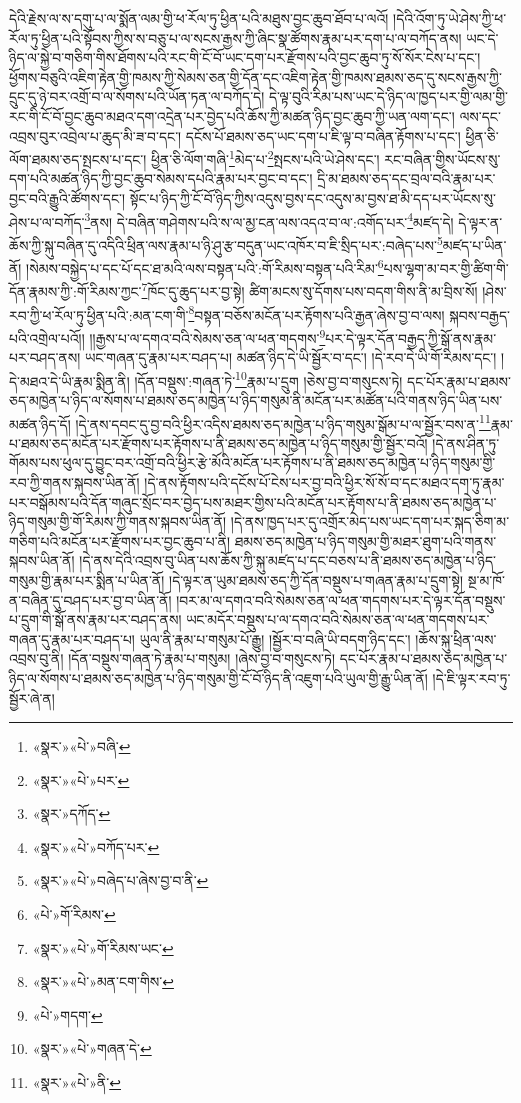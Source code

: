དེའི་རྗེས་ལ་ས་དགུ་པ་ལ་སྨོན་ལམ་གྱི་ཕ་རོལ་ཏུ་ཕྱིན་པའི་མཐུས་བྱང་ཆུབ་ཐོབ་པ་ལའོ། །དེའི་འོག་ཏུ་ཡེ་ཤེས་ཀྱི་ཕ་རོལ་ཏུ་ཕྱིན་པའི་སྟོབས་ཀྱིས་ས་བཅུ་པ་ལ་སངས་རྒྱས་ཀྱི་ཞིང་སྣ་ཚོགས་རྣམ་པར་དག་པ་ལ་བཀོད་ནས། ཡང་དེ་ཉིད་ལ་སྐྱེ་བ་གཅིག་གིས་ཐོགས་པའི་རང་གི་ངོ་བོ་ཡང་དག་པར་རྫོགས་པའི་བྱང་ཆུབ་ཏུ་སོ་སོར་ངེས་པ་དང་། ཕྱོགས་བཅུའི་འཇིག་རྟེན་གྱི་ཁམས་ཀྱི་སེམས་ཅན་གྱི་དོན་དང་འཇིག་རྟེན་གྱི་ཁམས་ཐམས་ཅད་དུ་སངས་རྒྱས་ཀྱི་དྲུང་དུ་ཉེ་བར་འགྲོ་བ་ལ་སོགས་པའི་ཡོན་ཏན་ལ་བཀོད་དེ། དེ་ལྟ་བུའི་རིམ་པས་ཡང་དེ་ཉིད་ལ་ཁྱད་པར་གྱི་ལམ་གྱི་རང་གི་ངོ་བོ་བྱང་ཆུབ་མཐའ་དག་འདྲེན་པར་བྱེད་པའི་ཆོས་ཀྱི་མཚན་ཉིད་བྱང་ཆུབ་ཀྱི་ཡན་ལག་དང་། ལས་དང་འབྲས་བུར་འབྲེལ་པ་ཆུད་མི་ཟ་བ་དང་། དངོས་པོ་ཐམས་ཅད་ཡང་དག་པ་ཇི་ལྟ་བ་བཞིན་རྟོགས་པ་དང་། ཕྱིན་ཅི་ལོག་ཐམས་ཅད་སྤངས་པ་དང་། ཕྱིན་ཅི་ལོག་གཞི་\footnote{«སྣར་»«པེ་»བཞི་}མེད་པ་\footnote{«སྣར་»«པེ་»པར་}སྤངས་པའི་ཡེ་ཤེས་དང་། རང་བཞིན་གྱིས་ཡོངས་སུ་དག་པའི་མཚན་ཉིད་ཀྱི་བྱང་ཆུབ་སེམས་དཔའི་རྣམ་པར་བྱང་བ་དང་། དྲི་མ་ཐམས་ཅད་དང་བྲལ་བའི་རྣམ་པར་བྱང་བའི་རྒྱུའི་ཚོགས་དང་། སྟོང་པ་ཉིད་ཀྱི་ངོ་བོ་ཉིད་ཀྱིས་འདུས་བྱས་དང་འདུས་མ་བྱས་ཐ་མི་དད་པར་ཡོངས་སུ་ཤེས་པ་ལ་བཀོད་\footnote{«སྣར་»དཀོད་}ནས། དེ་བཞིན་གཤེགས་པའི་ས་ལ་མྱ་ངན་ལས་འདའ་བ་ལ་:འགོད་པར་\footnote{«སྣར་»«པེ་»བཀོད་པར་}མཛད་དེ། དེ་ལྟར་ན་ཆོས་ཀྱི་སྐུ་བཞིན་དུ་འདིའི་ཕྲིན་ལས་རྣམ་པ་ཉི་ཤུ་རྩ་བདུན་ཡང་འཁོར་བ་ཇི་སྲིད་པར་:བཞེད་པས་\footnote{«སྣར་»«པེ་»བཞེད་པ་ཞེས་བྱ་བ་ནི་}མཛད་པ་ཡིན་ནོ། །སེམས་བསྐྱེད་པ་དང་པོ་དང་ཐ་མའི་ལས་བསྟན་པའི་:གོ་རིམས་བསྟན་པའི་རིམ་\footnote{«པེ་»གོ་རིམས་}པས་ལྷག་མ་བར་གྱི་ཚིག་གི་དོན་རྣམས་ཀྱི་:གོ་རིམས་ཀྱང་\footnote{«སྣར་»«པེ་»གོ་རིམས་ཡང་}ཁོང་དུ་ཆུད་པར་བྱ་སྟེ། ཚིག་མངས་སུ་དོགས་པས་བདག་གིས་ནི་མ་བྲིས་སོ། །ཤེས་རབ་ཀྱི་ཕ་རོལ་ཏུ་ཕྱིན་པའི་:མན་ངག་གི་\footnote{«སྣར་»«པེ་»མན་ངག་གིས་}བསྟན་བཅོས་མངོན་པར་རྟོགས་པའི་རྒྱན་ཞེས་བྱ་བ་ལས། སྐབས་བརྒྱད་པའི་འགྲེལ་པའོ།། །།རྒྱས་པ་ལ་དགའ་བའི་སེམས་ཅན་ལ་ཕན་གདགས་\footnote{«པེ་»གདག་}པར་དེ་ལྟར་དོན་བརྒྱད་ཀྱི་སྒོ་ནས་རྣམ་པར་བཤད་ནས། ཡང་གཞན་དུ་རྣམ་པར་བཤད་པ། མཚན་ཉིད་དེ་ཡི་སྦྱོར་བ་དང་། །དེ་རབ་དེ་ཡི་གོ་རིམས་དང་། །དེ་མཐའ་དེ་ཡི་རྣམ་སྨིན་ནི། །དོན་བསྡུས་:གཞན་ཏེ་\footnote{«སྣར་»«པེ་»གཞན་དེ་}རྣམ་པ་དྲུག །ཅེས་བྱ་བ་གསུངས་ཏེ། དང་པོར་རྣམ་པ་ཐམས་ཅད་མཁྱེན་པ་ཉིད་ལ་སོགས་པ་ཐམས་ཅད་མཁྱེན་པ་ཉིད་གསུམ་ནི་མངོན་པར་མཚོན་པའི་གནས་ཉིད་ཡིན་པས་མཚན་ཉིད་དོ། །དེ་ནས་དབང་དུ་བྱ་བའི་ཕྱིར་འདིས་ཐམས་ཅད་མཁྱེན་པ་ཉིད་གསུམ་སྒོམ་པ་ལ་སྦྱོར་བས་ན་\footnote{«སྣར་»«པེ་»ནི་}རྣམ་པ་ཐམས་ཅད་མངོན་པར་རྫོགས་པར་རྟོགས་པ་ནི་ཐམས་ཅད་མཁྱེན་པ་ཉིད་གསུམ་གྱི་སྦྱོར་བའོ། །དེ་ནས་ཤིན་ཏུ་གོམས་པས་ཕུལ་དུ་བྱུང་བར་འགྲོ་བའི་ཕྱིར་རྩེ་མོའི་མངོན་པར་རྟོགས་པ་ནི་ཐམས་ཅད་མཁྱེན་པ་ཉིད་གསུམ་གྱི་རབ་ཀྱི་གནས་སྐབས་ཡིན་ནོ། །དེ་ནས་རྟོགས་པའི་དངོས་པོ་ངེས་པར་བྱ་བའི་ཕྱིར་སོ་སོ་བ་དང་མཐའ་དག་ཏུ་རྣམ་པར་བསྒོམས་པའི་དོན་གཞུང་སྲོང་བར་བྱེད་པས་མཐར་གྱིས་པའི་མངོན་པར་རྟོགས་པ་ནི་ཐམས་ཅད་མཁྱེན་པ་ཉིད་གསུམ་གྱི་གོ་རིམས་ཀྱི་གནས་སྐབས་ཡིན་ནོ། །དེ་ནས་ཁྱད་པར་དུ་འགྲོར་མེད་པས་ཡང་དག་པར་སྐད་ཅིག་མ་གཅིག་པའི་མངོན་པར་རྫོགས་པར་བྱང་ཆུབ་པ་ནི། ཐམས་ཅད་མཁྱེན་པ་ཉིད་གསུམ་གྱི་མཐར་ཐུག་པའི་གནས་སྐབས་ཡིན་ནོ། །དེ་ནས་དེའི་འབྲས་བུ་ཡིན་པས་ཆོས་ཀྱི་སྐུ་མཛད་པ་དང་བཅས་པ་ནི་ཐམས་ཅད་མཁྱེན་པ་ཉིད་གསུམ་གྱི་རྣམ་པར་སྨིན་པ་ཡིན་ནོ། །དེ་ལྟར་ན་ཡུམ་ཐམས་ཅད་ཀྱི་དོན་བསྡུས་པ་གཞན་རྣམ་པ་དྲུག་སྟེ། སྔ་མ་ཁོ་ན་བཞིན་དུ་བཤད་པར་བྱ་བ་ཡིན་ནོ། །བར་མ་ལ་དགའ་བའི་སེམས་ཅན་ལ་ཕན་གདགས་པར་དེ་ལྟར་དོན་བསྡུས་པ་དྲུག་གི་སྒོ་ནས་རྣམ་པར་བཤད་ནས། ཡང་མདོར་བསྡུས་པ་ལ་དགའ་བའི་སེམས་ཅན་ལ་ཕན་གདགས་པར་གཞན་དུ་རྣམ་པར་བཤད་པ། ཡུལ་ནི་རྣམ་པ་གསུམ་པོ་རྒྱུ། །སྦྱོར་བ་བཞི་ཡི་བདག་ཉིད་དང་། །ཆོས་སྐུ་ཕྲིན་ལས་འབྲས་བུ་ནི། །དོན་བསྡུས་གཞན་ཏེ་རྣམ་པ་གསུམ། །ཞེས་བྱ་བ་གསུངས་ཏེ། དང་པོར་རྣམ་པ་ཐམས་ཅད་མཁྱེན་པ་ཉིད་ལ་སོགས་པ་ཐམས་ཅད་མཁྱེན་པ་ཉིད་གསུམ་གྱི་ངོ་བོ་ཉིད་ནི་འཇུག་པའི་ཡུལ་གྱི་རྒྱུ་ཡིན་ནོ། །དེ་ཇི་ལྟར་རབ་ཏུ་སྦྱོར་ཞེ་ན། 